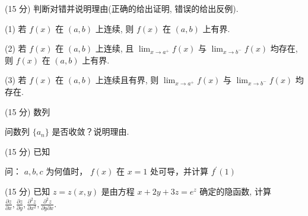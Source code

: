 (15 分) 判断对错并说明理由(正确的给出证明, 错误的给出反例).\par
(1) 若 $f(x)$ 在 $(a, b)$ 上连续, 则 $f(x)$ 在 $(a, b)$ 上有界.\par
(2) 若 $f(x)$ 在 $(a, b)$ 上连续, 且 $\lim_{x \to a^{+}} f(x)$ 与 $\lim_{x \to b^{-}} f(x)$ 均存在, 则 $f(x)$ 在 $(a, b)$ 上有界.\par
(3) 若 $f(x)$ 在 $(a, b)$ 上连续且有界, 则 $\lim_{x \to a^{+}} f(x)$ 与 $\lim_{x \to b^{-}} f(x)$ 均存在.\par
\par{}
(15 分) 数列\par
\nopagebreak[4]
问数列 $\{a_{n}\}$ 是否收敛？说明理由.\par
\par{}
(15 分) 已知\par
\nopagebreak[4]
问： $a,b,c$ 为何值时， $f(x)$ 在 $x = 1$ 处可导，并计算 $f^{\prime}(1)$\par
(15 分) 已知 $z = z(x, y)$ 是由方程 $x + 2y + 3z = e^z$ 确定的隐函数, 计算 $\frac{\partial z}{\partial x}, \frac{\partial z}{\partial y}, \frac{\partial^2 z}{\partial x^2}, \frac{\partial^2 z}{\partial y \partial x}$.\par
